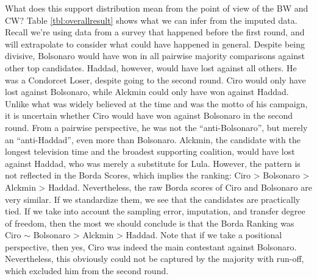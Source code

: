 \documentclass[hidelinks,11pt]{article} \usepackage[utf8]{inputenc}
\begin{document}
What does this support distribution mean from the point of view of the BW and
CW? Table \ref{tbl:overallresult} shows what we can infer from the imputed data.
Recall we're using data from a survey that happened before the first round, and
will extrapolate to consider what could have happened in general. Despite being
divisive, Bolsonaro would have won in all pairwise majority comparisons against
other top candidates. Haddad, however, would have lost against all others. He
was a Condorcet Loser, despite going to the second round. Ciro would only have
lost against Bolsonaro, while Alckmin could only have won against Haddad. Unlike
what was widely believed at the time and was the motto of his campaign, it is
uncertain whether Ciro would have won against Bolsonaro in the second round.
From a pairwise perspective, he was not the ``anti-Bolsonaro'', but merely an
``anti-Haddad'', even more than Bolsonaro. Alckmin, the candidate with the
longest television time and the broadest supporting coalition, would have lost
against Haddad, who was merely a substitute for Lula. However, the pattern is
not reflected in the Borda Scores, which implies the ranking: Ciro > Bolsonaro >
Alckmin > Haddad. Nevertheless, the raw Borda scores of Ciro and Bolsonaro are
very similar. If we standardize them, we see that the candidates are practically
tied. If we take into account the sampling error, imputation, and transfer
degree of freedom, then the most we should conclude is that the Borda Ranking
was Ciro \(\sim\) Bolsonaro > Alckmin > Haddad. Note that if we take a
positional perspective, then yes, Ciro was indeed the main contestant against
Bolsonaro. Nevertheless, this obviously could not be captured by the majority with run-off, which excluded him from the second round.
\end{document}
